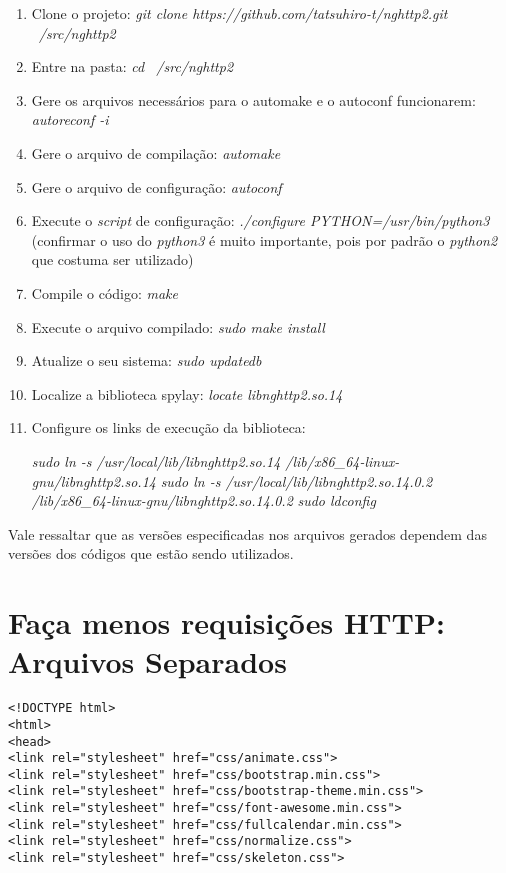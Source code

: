 \begin{apendicesenv}
\begin{enumerate}
	\item Clone o projeto: \textit{git clone https://github.com/tatsuhiro-t/nghttp2.git ~/src/nghttp2}
	\item Entre na pasta: \textit{cd ~/src/nghttp2}
	\item Gere os arquivos necessários para o automake e o autoconf funcionarem: \textit{autoreconf -i}
	\item Gere o arquivo de compilação: \textit{automake}
	\item Gere o arquivo de configuração: \textit{autoconf}
	\item Execute o \textit{script} de configuração: \textit{./configure PYTHON=/usr/bin/python3} (confirmar o uso do \textit{python3} é muito importante, pois por padrão o \textit{python2} que costuma ser utilizado)
	\item Compile o código: \textit{make}
	\item Execute o arquivo compilado: \textit{sudo make install}
	\item Atualize o seu sistema: \textit{sudo updatedb}
	\item Localize a biblioteca spylay: \textit{locate libnghttp2.so.14}
	\item Configure os links de execução da biblioteca:
		\begin{center}
			\textit{sudo ln -s /usr/local/lib/libnghttp2.so.14 /lib/x86\_64-linux-gnu/libnghttp2.so.14}
			\textit{sudo ln -s /usr/local/lib/libnghttp2.so.14.0.2 /lib/x86\_64-linux-gnu/libnghttp2.so.14.0.2}
			\textit{sudo ldconfig}
		\end{center}
\end{enumerate}

Vale ressaltar que as versões especificadas nos arquivos gerados dependem das versões dos códigos que estão sendo utilizados.

\lstset{language=HTML}
\chapter{Faça menos requisições HTTP: Arquivos Separados}
\label{apend:codigo_facamenosrequisicoeshttp_sep}

\begin{lstlisting}
<!DOCTYPE html>
<html>
<head>
<link rel="stylesheet" href="css/animate.css">
<link rel="stylesheet" href="css/bootstrap.min.css">
<link rel="stylesheet" href="css/bootstrap-theme.min.css">
<link rel="stylesheet" href="css/font-awesome.min.css">
<link rel="stylesheet" href="css/fullcalendar.min.css">
<link rel="stylesheet" href="css/normalize.css">
<link rel="stylesheet" href="css/skeleton.css">
	

\end{lstlisting}
\end{apendicesenv}
